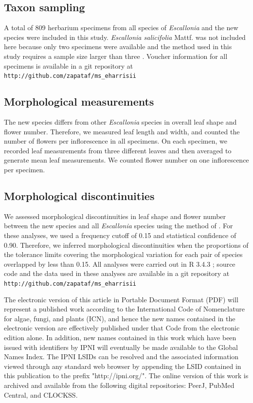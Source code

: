 \documentclass[fleqn,10pt,lineno]{wlpeerj} %
\begin{document}
\subsection*{Taxon sampling}

A total of 809 herbarium specimens from all species of \emph{Escallonia} and the new species were included in this study. \emph{Escallonia salicifolia} Mattf. was not included here because only two specimens were available and the method used in this study requires a sample size larger than three \citep{Zapata:2012it}. Voucher information for all specimens is available in a git repository at \texttt{http://github.com/zapataf/ms\_eharrisii}

\subsection*{Morphological measurements}

The new species differs from other \emph{Escallonia} species in overall leaf shape and flower number. Therefore, we measured leaf length and width, and counted the number of flowers per inflorescence in all specimens. On each specimen, we recorded leaf measurements from three different leaves and then averaged to generate mean leaf measurements. We counted flower number on one inflorescence per specimen.

\subsection*{Morphological discontinuities}

We assessed morphological discontinuities in leaf shape and flower number between the new species and all \emph{Escallonia} species using the method of \cite{Zapata:2012it}. For these analyses, we used a frequency cutoff of 0.15 and statistical confidence of 0.90. Therefore, we inferred morphological discontinuities when the proportions of the tolerance limits covering the morphological variation for each pair of species overlapped by less than 0.15. All analyses were carried out in R 3.4.3 \citep{R-base}; source code and the data used in these analyses are available in a git repository at \texttt{http://github.com/zapataf/ms\_eharrisii}

The electronic version of this article in Portable Document Format (PDF) will represent a published work according to the International Code of Nomenclature for algae, fungi, and plants (ICN), and hence the new names contained in the electronic version are effectively published under that Code from the electronic edition alone. In addition, new names contained in this work which have been issued with identifiers by IPNI will eventually be made available to the Global Names Index. The IPNI LSIDs can be resolved and the associated information viewed through any standard web browser by appending the LSID contained in this publication to the prefix "http://ipni.org/". The online version of this work is archived and available from the following digital repositories: PeerJ, PubMed Central, and CLOCKSS.
\end{document}
